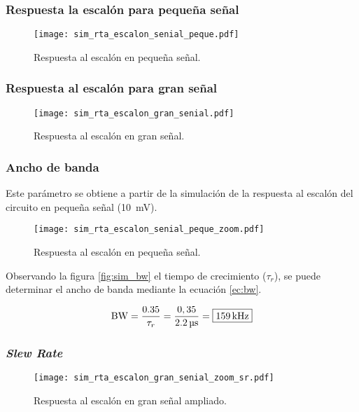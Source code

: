 \subsubsection{Respuesta la escalón para pequeña señal}

\begin{figure}[H]
	\centering
	\texttt{[image: sim\_rta\_escalon\_senial\_peque.pdf]}
	\caption{Respuesta al escalón en pequeña señal.}
	\label{fig:rta_escalon_peque}
\end{figure}

\subsubsection{Respuesta al escalón para gran señal}

\begin{figure}[H]
	\centering
	\texttt{[image: sim\_rta\_escalon\_gran\_senial.pdf]}
	\caption{Respuesta al escalón en gran señal.}
	\label{fig:rta_escalon_gran}
\end{figure}

\subsubsection{Ancho de banda}

	Este parámetro se obtiene a partir de la simulación de la respuesta al escalón del circuito en pequeña señal (\SI{10}{\milli\volt}).

\begin{figure}[H]
	\centering
	\texttt{[image: sim\_rta\_escalon\_senial\_peque\_zoom.pdf]}
	\caption{Respuesta al escalón en pequeña señal.}
	\label{fig:rta_escalon_peque}
\end{figure}

	Observando la figura \ref{fig:sim_bw} el tiempo de crecimiento ($\tau_r$), se puede determinar el ancho de banda mediante la ecuación \eqref{ec:bw}.

	\begin{equation}
		\centering
		\mathrm{BW} = \frac{\num{0,35}}{\tau_r} = \frac{0,35}{\SI{2.2}{\micro\second}} = \boxed{\SI{159}{\kilo\hertz}}
		\label{ec:bw}
	\end{equation}

\subsubsection{\textit{Slew Rate}}

\begin{figure}[H]
	\centering
	\texttt{[image: sim\_rta\_escalon\_gran\_senial\_zoom\_sr.pdf]}
	\caption{Respuesta al escalón en gran señal ampliado.}
	\label{fig:sim_rta_escalon_gran_sr}
\end{figure}

